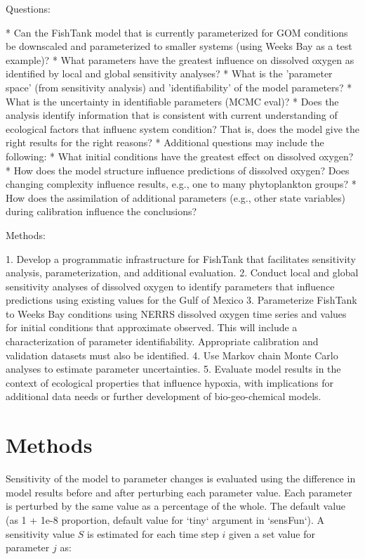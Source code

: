\documentclass[letterpaper,12pt,oneside]{article}\usepackage[]{graphicx}\usepackage[]{color}
\begin{document}
Questions:

* Can the FishTank model that is currently parameterized for GOM conditions be downscaled and parameterized to smaller systems (using Weeks Bay as a test example)?
* What parameters have the greatest influence on dissolved oxygen as identified by local and global sensitivity analyses?
* What is the 'parameter space' (from sensitivity analysis) and 'identifiability' of the model parameters?
* What is the uncertainty in identifiable parameters (MCMC eval)?
* Does the analysis identify information that is consistent with current understanding of ecological factors that influenc system condition?  That is, does the model give the right results for the right reasons?
* Additional questions may include the following:
    * What initial conditions have the greatest effect on dissolved oxygen?
    * How does the model structure influence predictions of dissolved oxygen?  Does changing complexity influence results, e.g., one to many phytoplankton groups?
    * How does the assimilation of additional parameters (e.g., other state variables) during calibration influence the conclusions?

Methods:

1. Develop a programmatic infrastructure for FishTank that facilitates sensitivity analysis, parameterization, and additional evaluation.
2. Conduct local and global sensitivity analyses of dissolved oxygen to identify parameters that influence predictions using existing values for the Gulf of Mexico
3. Parameterize FishTank to Weeks Bay conditions using NERRS dissolved oxygen time series and values for initial conditions that approximate observed.  This will include a characterization of parameter identifiability.  Appropriate calibration and validation datasets must also be identified.
4. Use Markov chain Monte Carlo analyses to estimate parameter uncertainties.
5. Evaluate model results in the context of ecological properties that influence hypoxia, with implications for additional data needs or further development of bio-geo-chemical models. 

\section{Methods}


Sensitivity of the model to parameter changes is evaluated using the difference in model results before and after perturbing each parameter value.  Each parameter is perturbed by the same value as a percentage of the whole.  The default value (as 1 + 1e-8 proportion, default value for `tiny` argument in `sensFun`).  A sensitivity value $S$ is estimated for each time step $i$ given a set value for parameter $j$ as:
\end{document}
